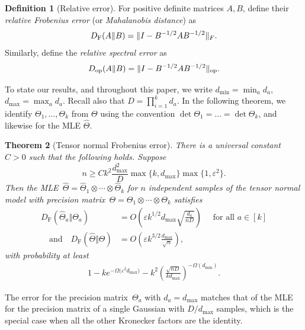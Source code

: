 \documentclass[aos]{imsart}
\newtheorem{theorem}{Theorem}[section]
\theoremstyle{definition}
\newtheorem{definition}[theorem]{Definition}
\numberwithin{equation}{section}
\DeclareMathOperator{\op}{op}
\DeclarePairedDelimiter{\norm}{\lVert}{\rVert}
\newcommand{\htheta}{\widehat{\Theta}}
\newcommand{\ot}{\otimes}
\newcommand{\eps}{\varepsilon}
\newcommand{\DF}{D_{\operatorname{F}}}
\newcommand{\Dop}{D_{\operatorname{op}}}
\def\dmax{d_{\max}}
\begin{document}
\begin{definition}[Relative error]\label{dfn:relative-error}
For positive definite matrices $A, B$, define their \emph{relative Frobenius error} (or \emph{Mahalanobis distance}) as
\begin{align}\label{eq:def D_F}
  \DF(A \Vert B) = \norm{I - B^{-1/2} A B^{-1/2}}_F.
\end{align}
Similarly, define the \emph{relative spectral error} as
\begin{align}\label{eq:def D_op}
  \Dop(A \Vert B) = \norm{I - B^{-1/2} A B^{-1/2}}_{\op}.
\end{align}
\end{definition}

To state our results, and throughout this paper, we write $d_{\min} = \min_a d_a$, $\dmax = \max_a d_a$.
Recall also that $D = \prod_{i=1}^k d_a$.
In the following theorem, we identify $\Theta_1,\dots,\Theta_k$ from $\Theta$ using the convention $\det\Theta_1=\dots=\det\Theta_k$, and likewise for the MLE $\htheta$.
\newcommand{\TensorFrob}[2]{%
There is a universal constant~$C>0$ such that the following holds.
Suppose
\begin{#1}#2
  n \geq C k^2 \frac{\dmax^2}{D} \max\{k, \dmax\} \max\{1 , \eps^2\}.
\end{#1}
Then the MLE~$\htheta = \htheta_1 \ot \cdots \ot \htheta_k$ for $n$ independent samples of the tensor normal model with precision matrix~$\Theta = \Theta_1 \ot \cdots \ot \Theta_k$ satisfies
\begin{align*}
  \DF(\htheta_a\Vert\Theta_a) &= O\left(\eps k^{1/2} \dmax \sqrt{\frac{d_a}{n D}} \right) \quad\text{ for all } a\in[k] \\
\quad\text{and}\quad
  \DF(\htheta\Vert\Theta) &= O\left(\eps k^{3/2} \frac{\dmax}{\sqrt{n}}\right),
\end{align*}
with probability at least
\begin{align*}
  1 - k e^{-\Omega\bigl( \eps^2 \dmax \bigr)} - k^2 \left( \frac{\sqrt{nD}}{k \dmax} \right)^{-\Omega(d_{\min})}.
\end{align*}}

\begin{theorem}[Tensor normal Frobenius error]\label{thm:tensor-frobenius}
\TensorFrob{equation}{\label{eq:eps sqr assm}}
\end{theorem}

The error for the precision matrix~$\Theta_a$ with $d_a = \dmax$ matches that of the MLE for the precision matrix of a single Gaussian with $D/\dmax$ samples, which is the special case when all the other Kronecker factors are the identity.
\end{document}
